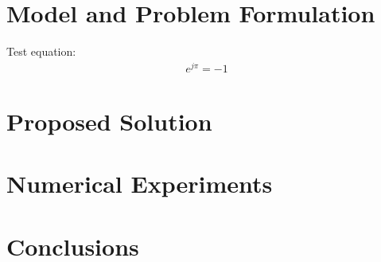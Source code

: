 \documentclass{article}
\begin{document}
\section{Model and Problem Formulation}

Test equation:
\begin{align}
    \label{eq:euler}
    e^{j\pi}=-1
\end{align}


\section{Proposed Solution}

\section{Numerical Experiments}

\begin{bullets}
\end{bullets}


\section{Conclusions}


\printmybibliography
\end{document}
